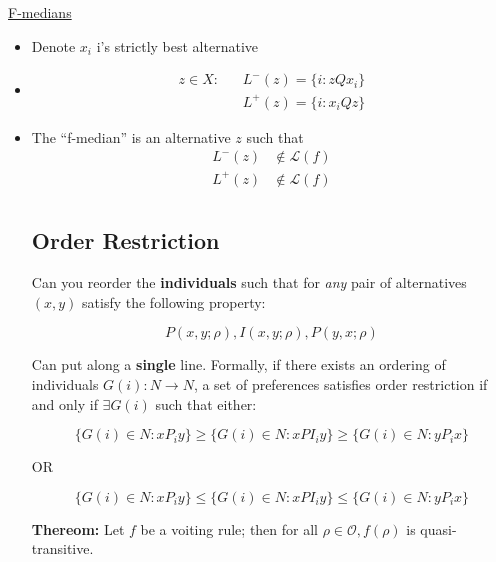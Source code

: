 \documentclass{article}
\newcommand{\Lm}{\mathcal{L}}
\newcommand{\Om}{\mathcal{O}}
\begin{document}
\underline{F-medians}

\begin{itemize}

\item Denote $x_i$ i's strictly best alternative
\item 
\begin{align*}
z\in X: \;\;\; &L^{-}(z)=\{i:zQx_i\} \\
&L^{+}(z)= \{i:x_iQz\} 
\end{align*}

\item The ``f-median'' is an alternative $z$ such that 
\begin{align*}
L^{-}(z) &\not \in \Lm (f)\\
L^{+}(z)&\not \in \Lm (f)\\
\end{align*}

\subsection*{Order Restriction}

Can you reorder the \textbf{individuals} such that for \emph{any} pair of alternatives $(x,y)$ satisfy the following property:

\[
P(x,y;\rho), I(x,y;\rho), P(y,x;\rho)
\]

Can put along a \textbf{single} line. Formally, if there exists an ordering of individuals $G(i): N \to N$, a set of preferences satisfies order restriction if and only if $\exists G(i)$ such that either:

\[
\{G(i)\in N:xP_iy\} \geq \{G(i)\in N:xPI_iy\} \geq \{G(i)\in N:yP_ix\}
\]

OR

\[
\{G(i)\in N:xP_iy\} \leq \{G(i)\in N:xPI_iy\} \leq \{G(i)\in N:yP_ix\}
\]

\textbf{Thereom:} Let $f$ be a voiting rule; then for all $\rho \in \Om, f(\rho)$ is quasi-transitive.


\end{itemize}
\end{document}
